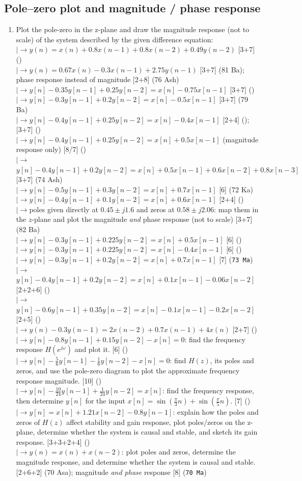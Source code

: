 \documentclass[12pt]{article}
\newcommand{\lb}{\\$\left|\rightarrow\right.$}
\begin{document}
  \subsection{Pole--zero plot and magnitude / phase response}
    \begin{enumerate}[topsep=0pt, noitemsep]
      \item Plot the pole-zero in the z-plane and draw the magnitude response (not to scale) of the system described by the given difference equation:
        \lb $y(n)=x(n)+0.8x(n-1)+0.8x(n-2)+0.49y(n-2)$ \hfill [3+7] ()
        \lb $y(n)=0.67x(n)-0.3x(n-1)+2.75y(n-1)$ \hfill [3+7] (81 Ba); phase response instead of magnitude \hfill [2+8] (76 Ash)
        \lb $y[n]-0.35y[n-1]+0.25y[n-2]=x[n]-0.75x[n-1]$ \hfill [3+7] ()
        \lb $y[n]-0.3y[n-1]+0.2y[n-2]=x[n]-0.5x[n-1]$ \hfill [3+7] (79 Ba)
        \lb $y[n]-0.4y[n-1]+0.25y[n-2]=x[n]-0.4x[n-1]$ \hfill [2+4] (); \hfill [3+7] ()
        \lb $y[n]-0.4y[n-1]+0.25y[n-2]=x[n]+0.5x[n-1]$ (magnitude response only) \hfill [8/7] ()
        \lb $y[n]-0.4y[n-1]+0.2y[n-2]=x[n]+0.5x[n-1]+0.6x[n-2]+0.8x[n-3]$ \hfill [3+7] (74 Ash)
        \lb $y[n]-0.5y[n-1]+0.3y[n-2]=x[n]+0.7x[n-1]$ \hfill [6] (72 Ka)
        \lb $y[n]-0.4y[n-1]+0.1y[n-2]=x[n]+0.6x[n-1]$ \hfill [2+4] ()
        \lb poles given directly at $0.45\pm j1.6$ and zeros at $0.58\pm j2.06$: map them in the $z$-plane and plot the magnitude \emph{and} phase response (not to scale) \hfill [3+7] (82 Ba)
        \lb $y[n]-0.3y[n-1]+0.225y[n-2]=x[n]+0.5x[n-1]$ \hfill [6] ()
        \lb $y[n]-0.3y[n-1]+0.225y[n-2]=x[n]-0.4x[n-1]$ \hfill [6] ()
        \lb $y[n]-0.3y[n-1]+0.2y[n-2]=x[n]+0.7x[n-1]$ \hfill [7] (\texttt{73 Ma})
        \lb $y[n]-0.4y[n-1]+0.2y[n-2]=x[n]+0.1x[n-1]-0.06x[n-2]$ \hfill [2+2+6] ()
        \lb $y[n]-0.6y[n-1]+0.35y[n-2]=x[n]-0.1x[n-1]-0.2x[n-2]$ \hfill [2+5] ()
        \lb $y(n)-0.3y(n-1)=2x(n-2)+0.7x(n-1)+4x(n)$ \hfill [2+7] ()
        \lb $y[n]-0.8y[n-1]+0.15y[n-2]-x[n]=0$: find the frequency response $H(e^{j\omega})$ and plot it. \hfill [6] ()
        \lb $y[n]-\tfrac56 y[n-1]-\tfrac16 y[n-2]-x[n]=0$: find $H(z)$, its poles and zeros, and use the pole-zero diagram to plot the approximate frequency response magnitude. \hfill [10] ()
        \lb $y[n]-\tfrac{10}{24}y[n-1]+\tfrac{1}{24}y[n-2]=x[n]$: find the frequency response, then determine $y[n]$ for the input $x[n]=\sin(\tfrac{\pi}{3}n)+\sin(\tfrac{\pi}{5}n)$. \hfill [7] ()
        \lb $y[n]=x[n]+1.21x[n-2]-0.8y[n-1]$: explain how the poles and zeros of $H(z)$ affect stability and gain response, plot poles/zeros on the z-plane, determine whether the system is causal and stable, and sketch its gain response. \hfill [3+3+2+4] ()
        \lb $y(n)=x(n)+x(n-2)$: plot poles and zeros, determine the magnitude response, and determine whether the system is causal and stable. \hfill [2+6+2] (70 Asa); magnitude \emph{and phase} response \hfill [8] (\texttt{70 Ma})


\end{enumerate}
\end{document}
